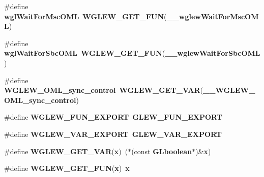 \begin{DoxyCompactItemize}
\item 
\#define {\bf wgl\+Wait\+For\+Msc\+O\+ML}~{\bf W\+G\+L\+E\+W\+\_\+\+G\+E\+T\+\_\+\+F\+UN}({\bf \+\_\+\+\_\+wglew\+Wait\+For\+Msc\+O\+ML})
\item 
\#define {\bf wgl\+Wait\+For\+Sbc\+O\+ML}~{\bf W\+G\+L\+E\+W\+\_\+\+G\+E\+T\+\_\+\+F\+UN}({\bf \+\_\+\+\_\+wglew\+Wait\+For\+Sbc\+O\+ML})
\item 
\#define {\bf W\+G\+L\+E\+W\+\_\+\+O\+M\+L\+\_\+sync\+\_\+control}~{\bf W\+G\+L\+E\+W\+\_\+\+G\+E\+T\+\_\+\+V\+AR}({\bf \+\_\+\+\_\+\+W\+G\+L\+E\+W\+\_\+\+O\+M\+L\+\_\+sync\+\_\+control})
\item 
\#define {\bf W\+G\+L\+E\+W\+\_\+\+F\+U\+N\+\_\+\+E\+X\+P\+O\+RT}~{\bf G\+L\+E\+W\+\_\+\+F\+U\+N\+\_\+\+E\+X\+P\+O\+RT}
\item 
\#define {\bf W\+G\+L\+E\+W\+\_\+\+V\+A\+R\+\_\+\+E\+X\+P\+O\+RT}~{\bf G\+L\+E\+W\+\_\+\+V\+A\+R\+\_\+\+E\+X\+P\+O\+RT}
\item 
\#define {\bf W\+G\+L\+E\+W\+\_\+\+G\+E\+T\+\_\+\+V\+AR}({\bf x})~($\ast$(const {\bf G\+Lboolean}$\ast$)\&{\bf x})
\item 
\#define {\bf W\+G\+L\+E\+W\+\_\+\+G\+E\+T\+\_\+\+F\+UN}({\bf x})~{\bf x}
\end{DoxyCompactItemize}
